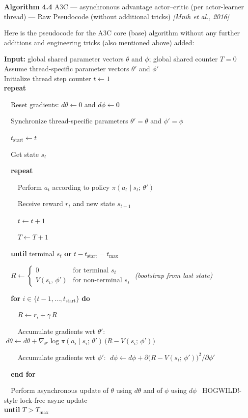 \documentclass[11pt]{article}
\begin{document}
    \label{pseudo-4-4}

    \begin{pseudobox}

\textbf{Algorithm 4.4} A3C --- asynchronous advantage actor--critic (per
actor-learner thread) --- Raw Pseudocode (without additional tricks)
\emph{{[}Mnih et al., 2016{]}}

\tcbline

Here is the pseudocode for the A3C core (base) algorithm without any
further additions and engineering tricks (also mentioned above) added:

\textbf{Input:} global shared parameter vectors \(\theta\) and \(\phi\);
global shared counter \(T = 0\)\\
Assume thread-specific parameter vectors \(\theta'\) and \(\phi'\)\\
Initialize thread step counter \(t \leftarrow 1\)\\
\textbf{repeat}\\
\strut ~~Reset gradients: \(d\theta \leftarrow 0\) and
\(d\phi \leftarrow 0\)\\
\strut ~~Synchronize thread-specific parameters \(\theta' = \theta\) and
\(\phi' = \phi\)\\
\strut ~~\(t_{\text{start}} \leftarrow t\)\\
\strut ~~Get state \(s_t\)\\
\strut ~~\textbf{repeat}\\
\strut ~~~~Perform \(a_t\) according to policy
\(\pi(a_t \mid s_t;\, \theta')\)\\
\strut ~~~~Receive reward \(r_t\) and new state \(s_{t+1}\)\\
\strut ~~~~\(t \leftarrow t + 1\)\\
\strut ~~~~\(T \leftarrow T + 1\)\\
\strut ~~\textbf{until} terminal \(s_t\) \textbf{or}
\(t - t_{\text{start}} = t_{\max}\)\\
\strut ~~\(R \leftarrow \begin{cases} 0 & \text{for terminal } s_t \\ V(s_t,\, \phi') & \text{for non-terminal } s_t \end{cases}\)
\emph{(bootstrap from last state)}\\
\strut ~~\textbf{for} \(i \in \{t - 1, \ldots, t_{\text{start}}\}\)
\textbf{do}\\
\strut ~~~~\(R \leftarrow r_i + \gamma\, R\)\\
\strut ~~~~Accumulate gradients wrt \(\theta'\):
\(\;d\theta \leftarrow d\theta + \nabla_{\theta'} \log \pi(a_i \mid s_i;\, \theta')\,\bigl(R - V(s_i;\, \phi')\bigr)\)\\
\strut ~~~~Accumulate gradients wrt \(\phi'\):
\(\;d\phi \leftarrow d\phi + \partial\bigl(R - V(s_i;\, \phi')\bigr)^{2} / \partial \phi'\)\\
\strut ~~\textbf{end for}\\
\strut ~~Perform asynchronous update of \(\theta\) using \(d\theta\) and
of \(\phi\) using \(d\phi\) ~HOGWILD!-style lock-free async update\\
\textbf{until} \(T > T_{\max}\)

\end{pseudobox}
\end{document}
